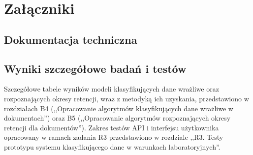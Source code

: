 \documentclass[12pt,a4paper]{report}
\begin{document}
\appendix

\chapter*{Załączniki}

\section*{Dokumentacja techniczna}


% 
% 
% 







\section*{Wyniki szczegółowe badań i testów}

Szczegółowe tabele wyników modeli klasyfikujących dane wrażliwe oraz rozpoznających okresy retencji, wraz z metodyką ich uzyskania, przedstawiono w rozdziałach B4 (,,Opracowanie algorytmów klasyfikujących dane wrażliwe w dokumentach'') oraz B5 (,,Opracowanie algorytmów rozpoznających okresy retencji dla dokumentów''). Zakres testów API i interfejsu użytkownika opracowany w ramach zadania R3 przedstawiono w rozdziale ,,R3. Testy prototypu systemu klasyfikującego dane w warunkach laboratoryjnych''.
\end{document}
